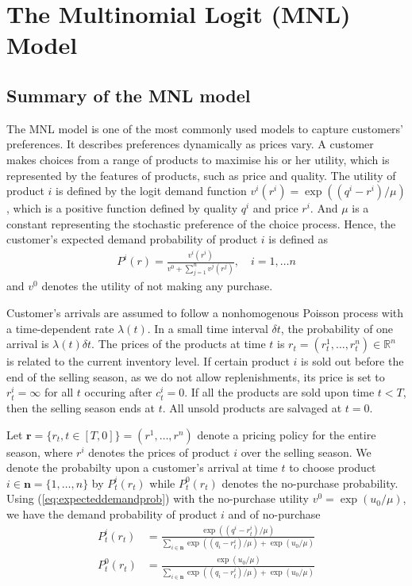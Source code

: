 \section{The Multinomial Logit (MNL) Model}


\subsection{Summary of the MNL model}
The MNL model is one of the most commonly used models to capture customers' preferences. It describes preferences dynamically as prices vary. A customer makes choices from a range of products to maximise his or her utility, which is represented by the features of products, such as price and quality. The utility of product $i$ is defined by the logit demand function $v^i(r^i) = \exp ((q^i-r^i)/\mu)$, which is a positive function defined by quality $q^i$ and price $r^i$. And $\mu$ is a constant representing the stochastic preference of the choice process. Hence, the customer's expected demand probability of product $i$ is defined as 
\begin{align}
P^i(r) = \frac{v^i(r^i)}{v^0+\sum_{j=1}^{n}v^j(r^j)},\quad i = 1, \ldots n\label{eq:expecteddemandprob}
\end{align}
and $v^0$ denotes the utility of not making any purchase.


Customer's arrivals are assumed to follow a nonhomogenous Poisson process with a time-dependent rate $\lambda(t)$. In a small time interval $\delta t$, the probability of one arrival is $\lambda(t)\delta t$. The prices of the products at time $t$ is $r_t = (r_t^1,\ldots,r_t^n) \in \mathbb{R}^n$ is related to the current inventory level. If certain product $i$ is sold out before the end of the selling season, as we do not allow replenishments, its price is set to $r^i_t = \infty$ for all $t$ occuring after $c^i_t=0$. If all the products are sold upon time $t < T$, then the selling season ends at $t$. All unsold products are salvaged at $t=0$. 


Let $\mathbf{r}=\{r_t, t \in [T,0]\} = (r^1, \ldots, r^n)$ denote a pricing policy for the entire season, where $r^i$ denotes the prices of product $i$ over the selling season. We denote the probabilty upon a customer's arrival at time $t$ to choose product $i \in \mathbf{n} = \{1,\ldots, n\}$ by $P_t^i(r_t)$ while $P_t^0(r_t)$ denotes the no-purchase probability. Using (\ref{eq:expecteddemandprob}) with the no-purchase utility $v^0 = \exp (u_0/\mu)$, we have the demand probability of product $i$ and of no-purchase
\begin{align}
P_t^i(r_t) &= \frac{\exp((q^i-r^i_t)/\mu)}{\sum_{i \in \mathbf{n}}\exp((q_i-r^i_t)/\mu)+\exp(u_0/\mu)} \label{eq:probi}\\
P_t^0(r_t)&= \frac{\exp(u_0/\mu)}{\sum_{i \in \mathbf{n}}\exp((q_i-r^i_t)/\mu)+\exp(u_0/\mu)}\label{eq:prob0}
\end{align}

